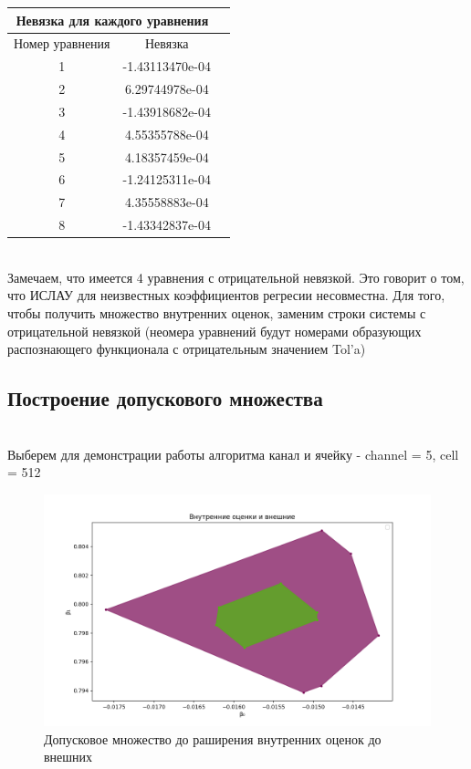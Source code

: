 \documentclass[a4paper,12pt]{article}
\begin{document}
\begin{center}
\begin{tabular}{|c|c|c|}
\hline
\multicolumn{2}{|c|}{Невязка для каждого уравнения}\\
\hline
Номер уравнения&Невязка\\
\hline
1&-1.43113470e-04\\
\hline
2&6.29744978e-04\\
\hline
3&-1.43918682e-04\\
\hline
4&4.55355788e-04\\
\hline
5&4.18357459e-04\\
\hline
6&-1.24125311e-04\\
\hline
7&4.35558883e-04\\
\hline
8&-1.43342837e-04
\end{tabular}
\end{center}\\

Замечаем, что имеется 4 уравнения с отрицательной невязкой. Это говорит о том, что ИСЛАУ для неизвестных коэффициентов регресии несовместна. Для того, чтобы получить множество внутренних оценок, заменим строки системы с отрицательной невязкой (неомера уравнений будут номерами образующих распознающего функционала с отрицательным значением Tol'a)

\newpage
\subsection{Построение допускового множества}\\
Выберем для демонстрации работы алгоритма канал и ячейку - channel = 5, cell = 512
\begin{figure}[h!]
    \centering
    \includegraphics[width=1\linewidth]{tol-after-alg.png}
    \caption{Допусковое множество до раширения внутренних оценок до внешних}
\end{figure}
\end{document}
